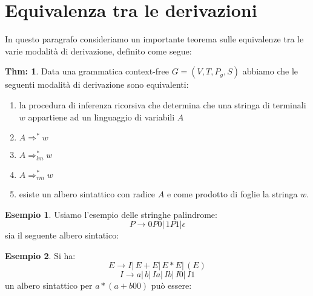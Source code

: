 \documentclass[a4paper]{book}
\theoremstyle{definition}%
\newtheorem{thm}{Thm:}[chapter]
\newtheorem*{esempio}{Esempio}
\begin{document}
  \section{Equivalenza tra le derivazioni}
  In questo paragrafo consideriamo un importante teorema sulle equivalenze tra le varie modalità di derivazione, definito come segue:
  \begin{thm}
    Data una grammatica context-free $G = (V, T,P_g,S)$ abbiamo che le seguenti modalità di derivazione sono equivalenti:
    \begin{enumerate}
    \item la procedura di inferenza ricorsiva che determina che una stringa di terminali $w$ appartiene ad un linguaggio di variabili $A$
    \item $A \Rightarrow ^ * w$
    \item $A \Rightarrow _{lm} ^ * w$
    \item $A \Rightarrow _{rm} ^ * w$
    \item esiste un albero sintattico con radice $A$ e come prodotto di foglie la stringa $w$.
    \end{enumerate}
  \end{thm}
  \begin{esempio}
Usiamo l'esempio delle stringhe palindrome:
$$P\to 0P0|\,1P1|\epsilon$$
sia il seguente albero sintatico:
\end{esempio}

\begin{esempio}
Si ha:
$$E\to I|\, E+E|\, E*E|\, (E)$$
$$I\to a|\,b|\,Ia|\,Ib|\,I0|\,I1$$
un albero sintattico per $a*(a+b00)$ può essere:
\end{esempio}
\end{document}
